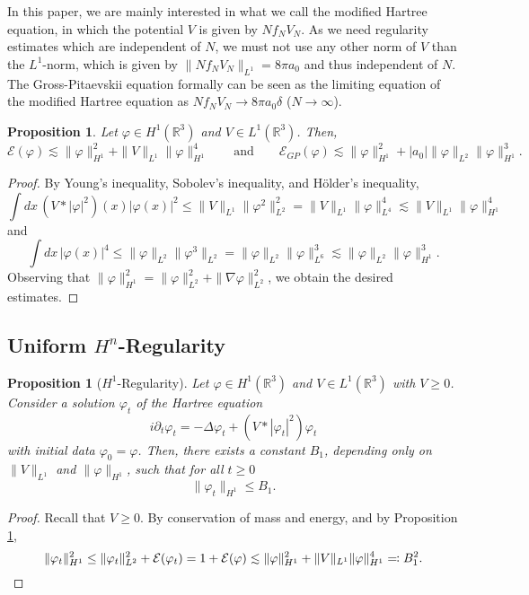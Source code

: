 \documentclass[11pt,a4paper,draft,DIV11]{scrartcl}	%
\newtheorem{prp}[thm]{Proposition}
\newcommand{\R}{\mathds{R}}
\newcommand{\norm}[1]{\lVert#1\rVert}	%
\begin{document}
In this paper, we are mainly interested in what we call the modified Hartree equation, in which the potential $V$ is given by $N f_N V_N$. As we need regularity estimates which are independent of $N$, we must not use any other norm of $V$ than the $L^1$-norm, which is given by $\norm{N f_N V_N}_{L^1} = 8 \pi a_0$ and thus independent of $N$. The Gross-Pitaevskii equation formally can be seen as the limiting equation of the modified Hartree equation as $N f_N V_N \to 8 \pi a_0 \delta$ ($N \to \infty$).


\begin{prp} \label{p:energy}
  Let $\varphi \in H^1(\R^3)$ and $V \in L^1(\R^3)$. Then,
  \[
    \mathcal{E}(\varphi) \apprle \| \varphi \|_{H^1}^2 + \| V \|_{L^1} \|
    \varphi \|_{H^1}^4 \qquad \text{and} \qquad \mathcal{E}_{GP}(\varphi)
    \apprle \| \varphi \|_{H^1}^2 + |a_0| \| \varphi \|_{L^2} \| \varphi
    \|_{H^1}^3.
  \]
\end{prp}


\begin{proof}
  By Young's inequality, Sobolev's inequality, and H\"older's inequality, 
  \[
    \int dx \, (V * |\varphi|^2)(x) |\varphi(x)|^2 \le \| V \|_{L^1} \|
    \varphi^2 \|_{L^2}^2 = \| V \|_{L^1} \| \varphi \|_{L^4}^4 \apprle \| V
    \|_{L^1} \| \varphi \|_{H^1}^4
  \]
  and
  \[
    \int dx \, |\varphi(x)|^4 \le \| \varphi \|_{L^2} \| \varphi^3 \|_{L^2} =
    \| \varphi \|_{L^2} \| \varphi \|_{L^6}^3 \apprle \| \varphi \|_{L^2} \|
    \varphi \|_{H^1}^3.
  \]
  Observing that $\| \varphi \|_{H^1}^2 = \| \varphi \|_{L^2}^2 + \| \nabla
  \varphi \|_{L^2}^2$, we obtain the desired estimates.
\end{proof}


\subsection{Uniform $H^n$-Regularity}

\begin{prp}[$H^1$-Regularity] \label{p:reg1}
  Let $\varphi \in H^1(\R^3)$ and $V \in L^1(\R^3)$ with $V \ge 0$. Consider a
  solution $\varphi_t$ of the Hartree equation
  \[
    i \partial_t \varphi_t = - \Delta \varphi_t + (V * |\varphi_t|^2)
    \varphi_t
  \]
  with initial data $\varphi_0 = \varphi$. Then, there exists a constant $B_1$, depending only on $\| V \|_{L^1}$ and $\| \varphi
  \|_{H^1}$, such that for all $t \geq 0$
\[
\norm{\varphi_t}_{H^1} \leq B_1. 
\]
\end{prp}
\begin{proof}
 Recall that $V \ge 0$. By conservation of mass and energy,
  and by Proposition \ref{p:energy},
  \[
    \| \varphi_t \|_{H^1}^2 \le \| \varphi_t \|_{L^2}^2 +
    \mathcal{E}(\varphi_t) = 1 + \mathcal{E}(\varphi) \apprle \| \varphi
    \|_{H^1}^2 + \| V \|_{L^1} \| \varphi \|_{H^1}^4 \eqqcolon B_1^2. \qedhere
  \]
\end{proof}
\end{document}
